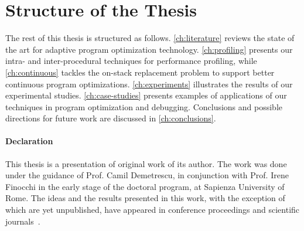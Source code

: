 \section{Structure of the Thesis}

The rest of this thesis is structured as follows. \mychapter\ref{ch:literature} reviews the state of the art for adaptive program optimization technology. \mychapter\ref{ch:profiling} presents our intra- and inter-procedural techniques for performance profiling, while \mychapter\ref {ch:continuous} tackles the on-stack replacement problem to support better continuous program optimizations. \mychapter\ref{ch:experiments} illustrates the results of our experimental studies. \mychapter\ref{ch:case-studies} presents examples of applications of our techniques in program optimization and debugging. Conclusions and possible directions for future work are discussed in \mychapter\ref{ch:conclusions}.

\paragraph*{Declaration} This thesis is a presentation of original work of its author. The work was done under the guidance of Prof. Camil Demetrescu, in conjunction with Prof. Irene Finocchi in the early stage of the doctoral program, at Sapienza University of Rome. The ideas and the results presented in this work, with the exception of  which are yet unpublished, have appeared in conference proceedings and scientific journals~\cite{Delia11,Delia13,Delia15,Delia16}.

